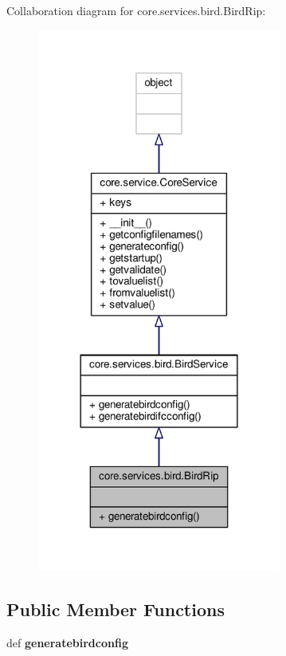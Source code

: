 Collaboration diagram for core.\+services.\+bird.\+Bird\+Rip\+:
\nopagebreak
\begin{figure}[H]
\begin{center}
\leavevmode
\includegraphics[width=227pt]{classcore_1_1services_1_1bird_1_1_bird_rip__coll__graph}
\end{center}
\end{figure}
\subsection*{Public Member Functions}
\begin{DoxyCompactItemize}
\item 
\hypertarget{classcore_1_1services_1_1bird_1_1_bird_rip_a46c425eaf1c563cf0ee7f8e28b140f67}{def {\bfseries generatebirdconfig}}\label{classcore_1_1services_1_1bird_1_1_bird_rip_a46c425eaf1c563cf0ee7f8e28b140f67}

\end{DoxyCompactItemize}
